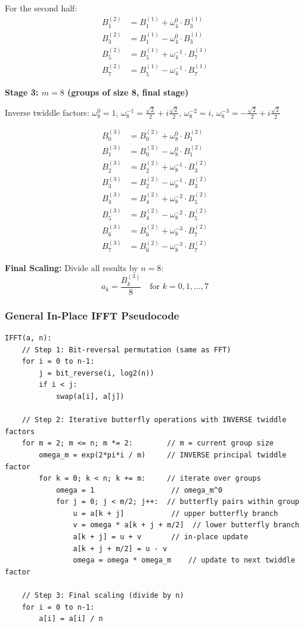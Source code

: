 \documentclass[a4paper]{article}
\theoremstyle{definition}
\begin{document}
For the second half:
\begin{align*}
B_1^{(2)} &= B_1^{(1)} + \omega_4^0 \cdot B_3^{(1)} \\
B_3^{(2)} &= B_1^{(1)} - \omega_4^0 \cdot B_3^{(1)} \\
B_5^{(2)} &= B_5^{(1)} + \omega_4^{-1} \cdot B_7^{(1)} \\
B_7^{(2)} &= B_5^{(1)} - \omega_4^{-1} \cdot B_7^{(1)}
\end{align*}

\textbf{Stage 3: \(m=8\) (groups of size 8, final stage)}

Inverse twiddle factors: \(\omega_8^0 = 1\), \(\omega_8^{-1} = \frac{\sqrt{2}}{2} + i\frac{\sqrt{2}}{2}\), \(\omega_8^{-2} = i\), \(\omega_8^{-3} = -\frac{\sqrt{2}}{2} + i\frac{\sqrt{2}}{2}\)

\begin{align*}
B_0^{(3)} &= B_0^{(2)} + \omega_8^0 \cdot B_1^{(2)} \\
B_1^{(3)} &= B_0^{(2)} - \omega_8^0 \cdot B_1^{(2)} \\
B_2^{(3)} &= B_2^{(2)} + \omega_8^{-1} \cdot B_3^{(2)} \\
B_3^{(3)} &= B_2^{(2)} - \omega_8^{-1} \cdot B_3^{(2)} \\
B_4^{(3)} &= B_4^{(2)} + \omega_8^{-2} \cdot B_5^{(2)} \\
B_5^{(3)} &= B_4^{(2)} - \omega_8^{-2} \cdot B_5^{(2)} \\
B_6^{(3)} &= B_6^{(2)} + \omega_8^{-3} \cdot B_7^{(2)} \\
B_7^{(3)} &= B_6^{(2)} - \omega_8^{-3} \cdot B_7^{(2)}
\end{align*}

\textbf{Final Scaling:} Divide all results by \(n = 8\):
\[
a_k = \frac{B_k^{(3)}}{8} \quad \text{for } k = 0, 1, \ldots, 7
\]

\subsubsection{General In-Place IFFT Pseudocode}

\begin{verbatim}
IFFT(a, n):
    // Step 1: Bit-reversal permutation (same as FFT)
    for i = 0 to n-1:
        j = bit_reverse(i, log2(n))
        if i < j:
            swap(a[i], a[j])

    // Step 2: Iterative butterfly operations with INVERSE twiddle factors
    for m = 2; m <= n; m *= 2:        // m = current group size
        omega_m = exp(2*pi*i / m)     // INVERSE principal twiddle factor
        for k = 0; k < n; k += m:     // iterate over groups
            omega = 1                  // omega_m^0
            for j = 0; j < m/2; j++:  // butterfly pairs within group
                u = a[k + j]           // upper butterfly branch
                v = omega * a[k + j + m/2]  // lower butterfly branch
                a[k + j] = u + v       // in-place update
                a[k + j + m/2] = u - v
                omega = omega * omega_m    // update to next twiddle factor

    // Step 3: Final scaling (divide by n)
    for i = 0 to n-1:
        a[i] = a[i] / n
\end{verbatim}
\end{document}
